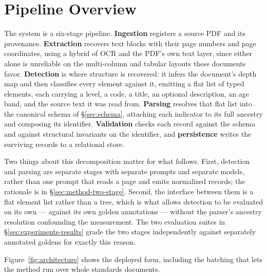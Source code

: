 %

\section{Pipeline Overview}
\label{sec:pipeline-overview}

The system is a six-stage pipeline. \textbf{Ingestion} registers a source PDF
and its provenance. \textbf{Extraction} recovers text blocks with their page
numbers and page coordinates, using a hybrid of OCR and the PDF's own text
layer, since either alone is unreliable on the multi-column and tabular layouts
these documents favor. \textbf{Detection} is where structure is recovered: it
infers the document's depth map and then classifies every element against it,
emitting a flat list of typed elements, each carrying a level, a code, a title,
an optional description, an age band, and the source text it was read from.
\textbf{Parsing} resolves that flat list into the canonical schema of
\S\ref{sec:schema}, attaching each indicator to its full ancestry and composing
its identifier. \textbf{Validation} checks each record against the schema and
against structural invariants on the identifier, and \textbf{persistence}
writes the surviving records to a relational store.

Two things about this decomposition matter for what follows. First, detection
and parsing are separate stages with separate prompts and separate models,
rather than one prompt that reads a page and emits normalized records; the
rationale is in \S\ref{sec:method-two-stage}. Second, the interface between
them is a flat element list rather than a tree, which is what allows detection
to be evaluated on its own --- against its own golden annotations --- without
the parser's ancestry resolution confounding the measurement. The two
evaluation suites in \S\ref{sec:experiments-results} grade the two stages
independently against separately annotated goldens for exactly this reason.

Figure~\ref{fig:architecture} shows the deployed form, including the batching
that lets the method run over whole standards documents.
